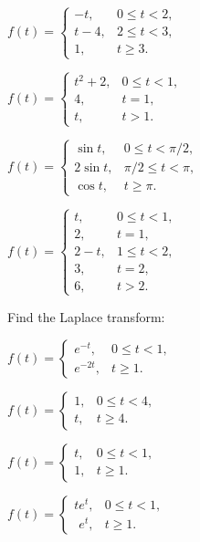 \begin{exerciselist}
\begin{alist*}[columns=2]
\item $f(t)=\begin{cases} -t,
& 0\le t<2,\\ t-4, & 2\le t<3,\\ 1, & t\ge
3.\end{cases}$
\item $f(t)=\begin{cases} t^2+2, & 0
\le t<1,\\4, & t=1,\\ t, & t>
1.\end{cases}$
\item $f(t)=\begin{cases}
\sin t, & 0\le t<\pi/ 2,\\ 2\sin t, &\pi/ 2
\le t<\pi,\\ \cos t, & t\ge\pi.\end{cases}$
\item $f(t)=\begin{cases}t,
 & 0\le t<1,\\ 2, & t=1,\\ 2-t, & 1
\le t<2,\\ 3, & t=2,\\ 6, & t>
2.\end{cases}$
\end{alist*}

\item\label{exer:8.1.5}Find the Laplace transform:

\begin{alist*}[columns=2]
\item $f(t)=\begin{cases} e^{-t}, &
0\le t<1,\\ e^{-2t}, & t\ge 1.\end{cases}$
\item $f(t)=\begin{cases} 1, & 0\le t<
4,\\ t, & t\ge 4.\end{cases}$
\item $f(t)=\begin{cases} t, & 0\le
t<1,\\ 1, & t\ge 1.\end{cases}$
\item $f(t)=\begin{cases} te^t, & 0\le
t<1,\\\phantom{t} e^t, & t\ge 1.\end{cases}$
\end{alist*}


\end{exerciselist}
